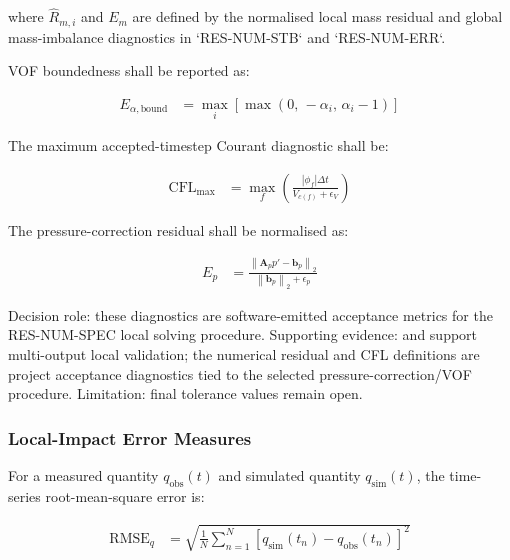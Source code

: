 where $\widehat{R}_{m,i}$ and $E_m$ are defined by the normalised
local mass residual and global mass-imbalance diagnostics in
`RES-NUM-STB` and `RES-NUM-ERR`.

VOF boundedness shall be reported as:

\begin{align}
  E_{\alpha,\mathrm{bound}}
  &=
  \max_i
  \left[
    \max
    \left(
      0,\,
      -\alpha_i,\,
      \alpha_i - 1
    \right)
  \right]
  \label{eq:res-ver-met-alpha-boundedness}
\end{align}

The maximum accepted-timestep Courant diagnostic shall be:

\begin{align}
  \mathrm{CFL}_{\max}
  &=
  \max_{f}
  \left(
    \frac{
      \left|
        \phi_f
      \right|
      \Delta t
    }{
      V_{c(f)}
      +
      \epsilon_V
    }
  \right)
  \label{eq:res-ver-met-cfl-maximum}
\end{align}

The pressure-correction residual shall be normalised as:

\begin{align}
  E_p
  &=
  \frac{
    \left\lVert
      \mathbf{A}_p p'
      -
      \mathbf{b}_p
    \right\rVert_2
  }{
    \left\lVert
      \mathbf{b}_p
    \right\rVert_2
    +
    \epsilon_p
  }
  \label{eq:res-ver-met-pressure-residual}
\end{align}

Decision role: these diagnostics are software-emitted acceptance
metrics for the RES-NUM-SPEC local solving procedure. Supporting
evidence: \textcite{watanabe2022validation} and \textcite{qin2018comparison}
support multi-output local validation; the numerical residual and CFL
definitions are project acceptance diagnostics tied to the selected
pressure-correction/VOF procedure. Limitation: final tolerance values
remain open.

\subsubsection{Local-Impact Error Measures}
\label{sec:res-ver-met-local-error-measures}

For a measured quantity $q_{\mathrm{obs}}(t)$ and simulated quantity
$q_{\mathrm{sim}}(t)$, the time-series root-mean-square error is:

\begin{align}
  \operatorname{RMSE}_{q}
  &=
  \sqrt{
    \frac{1}{N}
    \sum_{n=1}^{N}
    \left[
      q_{\mathrm{sim}}(t_n)
      -
      q_{\mathrm{obs}}(t_n)
    \right]^2
  }
  \label{eq:res-ver-met-local-rmse}
\end{align}


